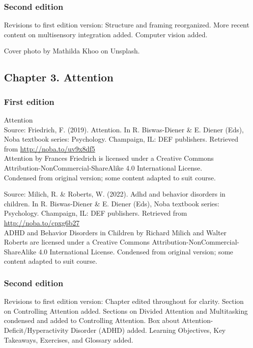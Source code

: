 \documentclass[
]{krantz}
\begin{document}
\subsubsection*{Second edition}\label{second-edition-2}


Revisions to first edition version: Structure and framing reorganized. More recent content on multisensory integration added. Computer vision added.

Cover photo by Mathilda Khoo on Unsplash.

\subsection*{Chapter 3. Attention}\label{chapter-3.-attention}


\subsubsection*{First edition}\label{first-edition-3}


Attention\\
Source: Friedrich, F. (2019). Attention. In R. Biswas-Diener \& E. Diener (Eds), Noba textbook series: Psychology. Champaign, IL: DEF publishers. Retrieved from \url{http://noba.to/uv9x8df5}\\
Attention by Frances Friedrich is licensed under a Creative Commons Attribution-NonCommercial-ShareAlike 4.0 International License.\\
Condensed from original version; some content adapted to suit course.

Source: Milich, R. \& Roberts, W. (2022). Adhd and behavior disorders in children. In R. Biswas-Diener \& E. Diener (Eds), Noba textbook series: Psychology. Champaign, IL: DEF publishers. Retrieved from \url{http://noba.to/cpxg6b27}\\
ADHD and Behavior Disorders in Children by Richard Milich and Walter Roberts are licensed under a Creative Commons Attribution-NonCommercial-ShareAlike 4.0 International License.
Condensed from original version; some content adapted to suit course.

\subsubsection*{Second edition}\label{second-edition-3}


Revisions to first edition version: Chapter edited throughout for clarity. Section on Controlling Attention added. Sections on Divided Attention and Multitasking condensed and added to Controlling Attention. Box about Attention-Deficit/Hyperactivity Disorder (ADHD) added. Learning Objectives, Key Takeaways, Exercises, and Glossary added.
\end{document}
